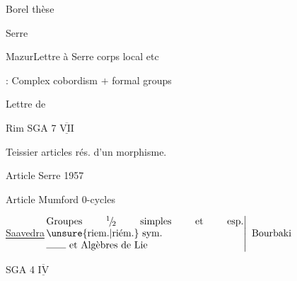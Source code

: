 Borel thèse

Serre 

Mazur\qquad Lettre à Serre corps  local etc


 : Complex cobordism $+$ formal groups

Lettre de 

Rim SGA 7 $\overline{\underline{\mathrm{VII}}}$

Teissier articles  rés. d'un morphisme.

\qquad Article Serre 1957

\qquad Article Mumford $0$-cycles

\uline{Saavedra}\qquad \(\left.\begin{array}{@{}p{.58\linewidth}@{}}Groupes ${}^{1}\!/\!{}_{2}$ simples et esp. \unsure{riem.|riém.} sym.\\\rule{2em}{.35pt} et Algèbres de Lie\end{array}\right\vert\ \text{Bourbaki}\)

SGA 4 $\overline{\underline{\mathrm{IV}}}$


